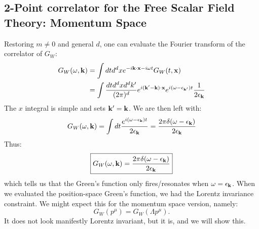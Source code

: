 \subsection{2-Point correlator for the Free Scalar Field Theory: Momentum Space}
Restoring $m \neq 0$ and general $d$, one can evaluate the Fourier transform of the correlator of $G_W$:
\begin{equation}
    \begin{split}
        G_W(\omega, \mathbf{k}) &= \int dt d^dx e^{-i\mathbf{k}\cdot\mathbf{x} - i\omega t}G_W(t, \mathbf{x})
        \\ &= \int \frac{dtd^dxd^dk'}{(2\pi)^d}e^{i(\mathbf{k}' - \mathbf{k})\cdot \mathbf{x}} e^{i(\omega - \epsilon_{\mathbf{k}'})t}\frac{1}{2\epsilon_{\mathbf{k}}}
    \end{split}
\end{equation}
The $x$ integral is simple and sets $\mathbf{k'} = \mathbf{k}$. We are then left with:
\begin{equation}
    G_W(\omega, \mathbf{k}) = \int dt \frac{e^{i(\omega - \epsilon_{\mathbf{k}})t}}{2\epsilon_{\mathbf{k}}} = \frac{2\pi\delta(\omega - \epsilon_{\mathbf{k}})}{2\epsilon_{\mathbf{k}}}
\end{equation}
Thus:
\begin{equation}
    \boxed{G_W(\omega, \mathbf{k}) = \frac{2\pi\delta(\omega - \epsilon_{\mathbf{k}})}{2\epsilon_{\mathbf{k}}}}
\end{equation}
which tells us that the Green's function only fires/resonates when $\omega = \epsilon_{\mathbf{k}}$. When we evaluated the position-space Green's function, we had the Lorentz invariance constraint. We might expect this for the momentum space version, namely:
\begin{equation}
    G_W(p^\mu) = G_W(\Lambda p^\mu).
\end{equation}
It does not look manifestly Lorentz invariant, but it is, and we will show this.

